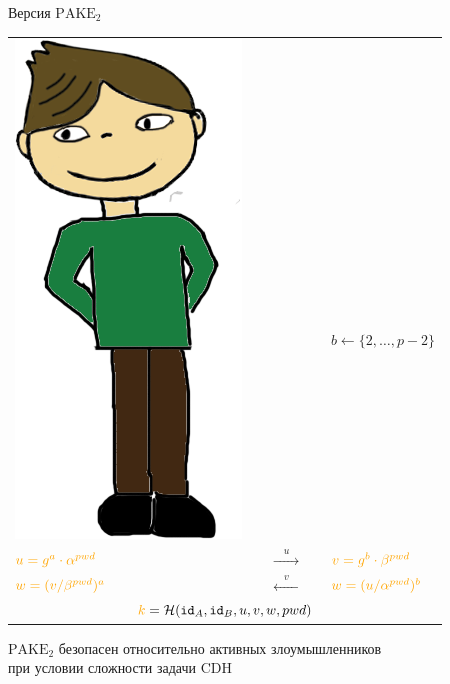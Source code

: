 \documentclass[usenames,dvipsnames,8pt,aspectratio=169]{beamer}
\begin{document}
\begin{frame}{ Версия $\text{PAKE}_2$}
\begin{center}
\begin{center}
\begin{tabular}{l c c c l}
			\multirow{2}{*}{\includegraphics[scale=0.15]{Bob}} &    \\[10pt]
			$ a \leftarrow \{2, \ldots, p-2 \}$ & & &  &\hspace{-30pt} $b \leftarrow \{2, \ldots, p-2 \}$ \\[3pt]
			\huge ${\color{Orange} u = g^a \cdot \alpha^{pwd}} $ & & {\Huge $\xrightarrow{\quad u \quad }$}& & \hspace{-30pt}  \huge ${\color{Orange} v = g^b \cdot \beta^{pwd}} $ \\[3pt]
			\huge $ {\color{Orange}w = (v/\beta^{pwd})^a}$& &  {\Huge $\xleftarrow{\quad v \quad }$}&  & \huge \hspace{-30pt} ${\color{Orange}w = (u/\alpha^{pwd})^b}$ \\[17pt]
			\multicolumn{5}{c}{ \LARGE ${\color{Orange}k} =\Hash(\mathtt{id}_{A}, \mathtt{id}_{B}, u, v, w, pwd) $}   \\
		\end{tabular}
	\end{center}
\end{center}

\vspace{20pt}

$\text{PAKE}_2$ безопасен относительно {\color{Orange} активных} злоумышленников \\ при условии сложности задачи CDH \\


\end{frame}
\end{document}
